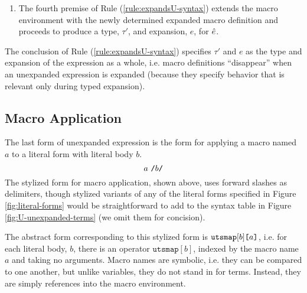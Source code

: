 \begin{enumerate}
This judgement is inductively defined by the following rules:
\begin{subequations}\label{rules:macenvOK-U}
\begin{equation}\label{rule:macenvOK-empty}
\inferrule{ }{\macenvOK{\Delta}{\emptyset}}
\end{equation}
\begin{equation}\label{rule:macenvOK-ext}
\inferrule{
  \macenvOK{\Delta}{\Sigma}\\\\
  \istypeU{\Delta}{\tau}\\
  \hastypeU{\emptyset}{\emptyset}{\eparse}{\aparr{\tBody}{\tParseResultExp}}
}{
  \macenvOK{\Delta}{\Sigma, \tsmenvbnd{a}{\tau}{\eparse}}
}
\end{equation}
\end{subequations}

The third premise of Rule (\ref{rule:expandsU-syntax}) checks that there is not already a macro named $a$ in the macro environment, $\Sigma$. 
\item 
The fourth premise of Rule (\ref{rule:expandsU-syntax}) extends the macro environment with the newly determined expanded macro definition and proceeds to produce a type, $\tau'$, and expansion, $e$, for $\hat{e}$.
\end{enumerate}
The conclusion of Rule (\ref{rule:expandsU-syntax}) specifies $\tau'$ and $e$ as the type and expansion of the expression as a whole, i.e. macro definitions ``disappear'' when an unexpanded expression is expanded (because they specify behavior that is relevant only during typed expansion). 

\subsection{Macro Application}
The last form of unexpanded expression is the form for applying a macro named $a$ to a literal form with literal body $b$. 
\[
a~\texttt{/}b\texttt{/}
\] 
The stylized form for macro application, shown above, uses forward slashes as delimiters, though stylized variants of any of the literal forms specified in Figure \ref{fig:literal-forms} would be straightforward to add to the syntax table in Figure \ref{fig:U-unexpanded-terms} (we omit them for concision).

The abstract form corresponding to this stylized form is $\texttt{utsmap}[b]\texttt{[}a\texttt{]}$, i.e. for each literal body, $b$, there is an operator $\texttt{utsmap}[b]$, indexed by the macro name $a$ and taking no arguments. Macro names are symbolic, i.e. they can be compared to one another, but unlike variables, they do not stand in for terms. Instead, they are simply references into the macro environment. 

